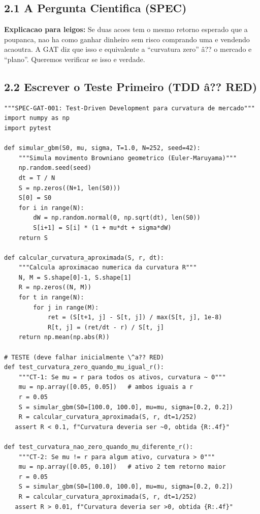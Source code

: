 \subsection{2.1 A Pergunta Cientifica (SPEC)}

\begin{center}
\end{center}

\textbf{Explicacao para leigos:} Se duas acoes tem o mesmo retorno esperado
que a poupanca, nao ha como ganhar dinheiro sem risco comprando uma e
vendendo acaoutra. A GAT diz que isso e equivalente a ``curvatura zero'' \^a??
o mercado e ``plano''. Queremos verificar se isso e verdade.

\subsection{2.2 Escrever o Teste Primeiro (TDD \^a?? RED)}

\begin{lstlisting}[caption={test\_gat\_curvatura.py \^a?? Teste antes do codigo}, label=lst:tdd1]
"""SPEC-GAT-001: Test-Driven Development para curvatura de mercado"""
import numpy as np
import pytest

def simular_gbm(S0, mu, sigma, T=1.0, N=252, seed=42):
    """Simula movimento Browniano geometrico (Euler-Maruyama)"""
    np.random.seed(seed)
    dt = T / N
    S = np.zeros((N+1, len(S0)))
    S[0] = S0
    for i in range(N):
        dW = np.random.normal(0, np.sqrt(dt), len(S0))
        S[i+1] = S[i] * (1 + mu*dt + sigma*dW)
    return S

def calcular_curvatura_aproximada(S, r, dt):
    """Calcula aproximacao numerica da curvatura R"""
    N, M = S.shape[0]-1, S.shape[1]
    R = np.zeros((N, M))
    for t in range(N):
        for j in range(M):
            ret = (S[t+1, j] - S[t, j]) / max(S[t, j], 1e-8)
            R[t, j] = (ret/dt - r) / S[t, j]
    return np.mean(np.abs(R))

# TESTE (deve falhar inicialmente \^a?? RED)
def test_curvatura_zero_quando_mu_igual_r():
    """CT-1: Se mu = r para todos os ativos, curvatura ~ 0"""
    mu = np.array([0.05, 0.05])   # ambos iguais a r
    r = 0.05
    S = simular_gbm(S0=[100.0, 100.0], mu=mu, sigma=[0.2, 0.2])
    R = calcular_curvatura_aproximada(S, r, dt=1/252)
   assert R < 0.1, f"Curvatura deveria ser ~0, obtida {R:.4f}"

def test_curvatura_nao_zero_quando_mu_diferente_r():
    """CT-2: Se mu != r para algum ativo, curvatura > 0"""
    mu = np.array([0.05, 0.10])   # ativo 2 tem retorno maior
    r = 0.05
    S = simular_gbm(S0=[100.0, 100.0], mu=mu, sigma=[0.2, 0.2])
    R = calcular_curvatura_aproximada(S, r, dt=1/252)
   assert R > 0.01, f"Curvatura deveria ser >0, obtida {R:.4f}"
\end{lstlisting}

